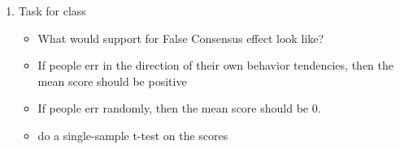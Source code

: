 \documentclass[11pt]{article}
\begin{document}
\begin{enumerate}
\item Task for class
\begin{itemize}
\item What would support for False Consensus effect look like?
\item If people err in the direction of their own behavior tendencies, then the mean score should be positive
\item If people err randomly, then the mean score should be 0.
\item do a single-sample t-test on the scores
\end{itemize}
\end{enumerate}
\end{document}
